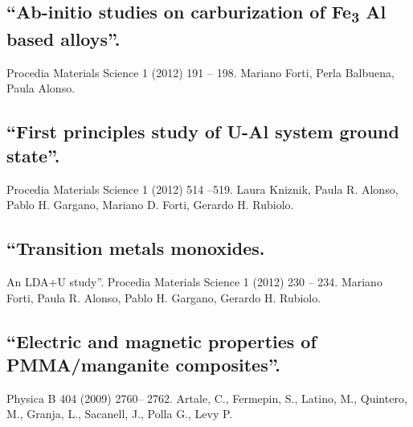 \subsection{“Ab-initio studies on carburization of Fe\textsubscript{3} Al based alloys”. } Procedia Materials Science 1 (2012) 191 – 198. Mariano Forti, Perla Balbuena, Paula Alonso.

 \subsection{“First principles study of U-Al system ground state”. } Procedia Materials Science 1 (2012) 514 –519. Laura Kniznik, Paula R. Alonso, Pablo H. Gargano, Mariano D. Forti, Gerardo H. Rubiolo.

\subsection{“Transition metals monoxides. } An LDA+U study”. Procedia Materials Science 1 (2012) 230 – 234. Mariano Forti, Paula R. Alonso, Pablo H. Gargano, Gerardo H. Rubiolo.

\subsection{“Electric and magnetic properties of PMMA/manganite composites”. } Physica B 404 (2009) 2760– 2762. Artale, C., Fermepin, S., Latino, M., Quintero, M., Granja, L., Sacanell, J., Polla G., Levy P. 

